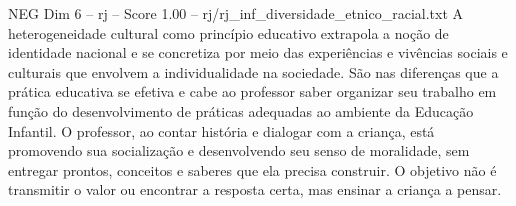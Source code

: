 \begin{textsample}{NEG Dim 6 – rj – Score 1.00 – rj/rj\_inf\_diversidade\_etnico\_racial.txt}
A heterogeneidade cultural como princípio educativo extrapola a noção de identidade nacional e se concretiza por meio das experiências e vivências sociais e culturais que envolvem a individualidade na sociedade.
São nas diferenças que a prática educativa se efetiva e cabe ao professor saber organizar seu trabalho em função do desenvolvimento de práticas adequadas ao ambiente da Educação Infantil.
O professor, ao contar história e dialogar com a criança, está promovendo sua socialização e desenvolvendo seu senso de moralidade, sem entregar prontos, conceitos e saberes que ela precisa construir.
O objetivo não é transmitir o valor ou encontrar a resposta certa, mas ensinar a criança a pensar.

\end{textsample}
